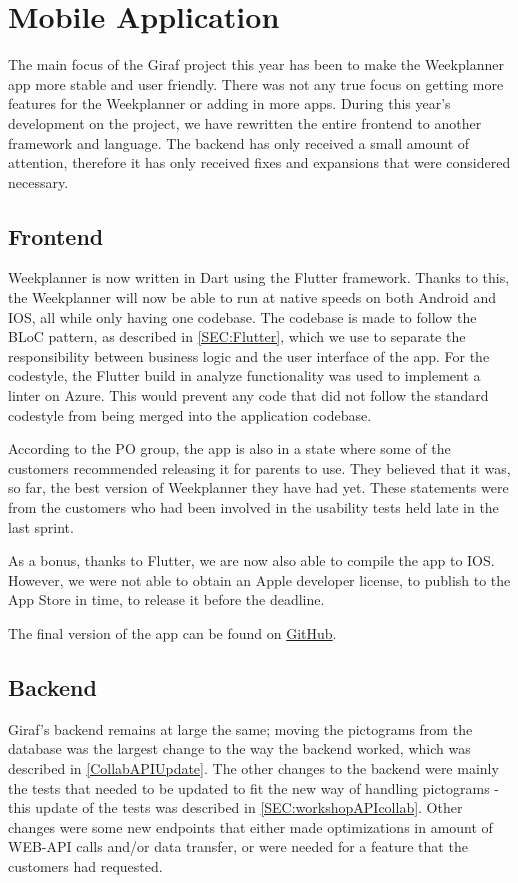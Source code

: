 \section{Mobile Application}
The main focus of the Giraf project this year has been to make the Weekplanner app more stable and user friendly.
There was not any true focus on getting more features for the Weekplanner or adding in more apps.
During this year's development on the project, we have rewritten the entire frontend to another framework and language.
The backend has only received a small amount of attention, therefore it has only received fixes and expansions that were considered necessary.

\subsection{Frontend}
Weekplanner is now written in Dart using the Flutter framework.
Thanks to this, the Weekplanner will now be able to run at native speeds on both Android and IOS, all while only having one codebase.
The codebase is made to follow the BLoC pattern, as described in \autoref{SEC:Flutter}, which we use to separate the responsibility between business logic and the user interface of the app. 
For the codestyle, the Flutter build in analyze functionality was used to implement a linter on Azure. 
This would prevent any code that did not follow the standard codestyle from being merged into the application codebase.

According to the PO group, the app is also in a state where some of the customers recommended releasing it for parents to use.
They believed that it was, so far, the best version of Weekplanner they have had yet.
These statements were from the customers who had been involved in the usability tests held late in the last sprint.

As a bonus, thanks to Flutter, we are now also able to compile the app to IOS.
However, we were not able to obtain an Apple developer license, to publish to the App Store in time, to release it before the deadline.

The final version of the app can be found on \href{https://github.com/aau-giraf/weekplanner/tree/2019-Final}{GitHub}.


\subsection{Backend}
Giraf's backend remains at large the same; moving the pictograms from the database was the largest change to the way the backend worked, which was described in \autoref{CollabAPIUpdate}.
The other changes to the backend were mainly the tests that needed to be updated to fit the new way of handling pictograms - this update of the tests was described in \autoref{SEC:workshopAPIcollab}.
Other changes were some new endpoints that either made optimizations in amount of WEB-API calls and/or data transfer, or were needed for a feature that the customers had requested.

